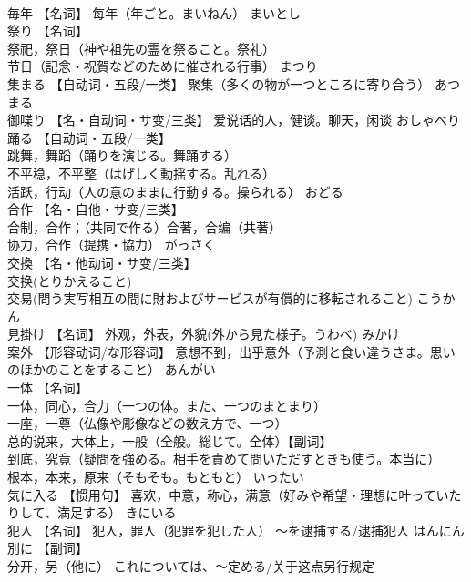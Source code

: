 \documentclass[8pt]{extreport}
\begin{document}
\begin{CJK}{UTF8}{min}
\\	毎年	【名词】 每年（年ごと。まいねん）	まいとし	
\\	祭り	【名词】 
\\	祭祀，祭日（神や祖先の霊を祭ること。祭礼） 
\\	节日（記念・祝賀などのために催される行事）	まつり	
\\	集まる	【自动词・五段/一类】 聚集（多くの物が一つところに寄り合う）	あつまる	
\\	御喋り	【名・自动词・サ变/三类】 爱说话的人，健谈。聊天，闲谈	おしゃべり	
\\	踊る	【自动词・五段/一类】 
\\	跳舞，舞蹈（踊りを演じる。舞踊する） 
\\	不平稳，不平整（はげしく動揺する。乱れる） 
\\	活跃，行动（人の意のままに行動する。操られる）	おどる	
\\	合作	【名・自他・サ变/三类】 
\\	合制，合作；（共同で作る）合著，合编（共著） 
\\	协力，合作（提携・協力）	がっさく	
\\	交換	【名・他动词・サ变/三类】 
\\	交换(とりかえること) 
\\	交易(問う実写相互の間に財およびサービスが有償的に移転されること)	こうかん	
\\	見掛け	【名词】 外观，外表，外貌(外から見た様子。うわべ)	みかけ	
\\	案外	【形容动词/な形容词】 意想不到，出乎意外（予測と食い違うさま。思いのほかのことをすること）	あんがい	
\\	一体	【名词】 
\\	一体，同心，合力（一つの体。また、一つのまとまり） 
\\	一座，一尊（仏像や彫像などの数え方で、一つ） 
\\	总的说来，大体上，一般（全般。総じて。全体）【副词】 
\\	到底，究竟（疑問を強める。相手を責めて問いただすときも使う。本当に） 
\\	根本，本来，原来（そもそも。もともと）	いったい	
\\	気に入る	【惯用句】 喜欢，中意，称心，满意（好みや希望・理想に叶っていたりして、満足する）	きにいる	
\\	犯人	【名词】 犯人，罪人（犯罪を犯した人） 〜を逮捕する/逮捕犯人	はんにん	
\\	別に	【副词】 
\\	分开，另（他に） これについては、〜定める/关于这点另行规定 

\end{CJK}
\end{document}
